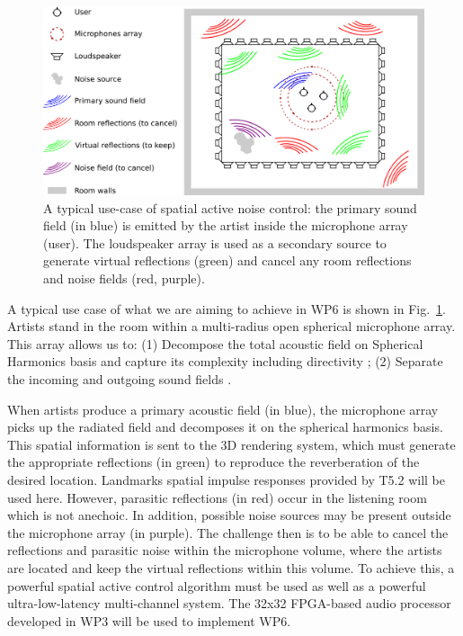 \documentclass[a4paper,9pt]{extarticle}
\begin{document}
\begin{figure}[!htpb]
    \centering
    \includegraphics[width=13cm]{img/spatial_anc.png}
    \caption{A typical use-case of spatial active noise control: the primary sound field (in blue) is emitted by the artist inside the microphone array (user). The loudspeaker array is used as a secondary source to generate virtual reflections (green) and cancel any room reflections and noise fields (red, purple).}
    \label{fig:spatial_anc}
\end{figure}

A typical use case of what we are aiming to achieve in WP6 is shown in Fig.~\ref{fig:spatial_anc}. Artists stand in the room within a multi-radius open spherical microphone array. This array allows us to: (1) Decompose the total acoustic field on Spherical Harmonics basis  \cite{jin2014design} and capture its complexity including directivity \cite{pollow2009measuring}; (2) Separate the incoming and outgoing sound fields \cite{braikia2013evaluation}.

When artists produce a primary acoustic field (in blue), the microphone array picks up the radiated field and decomposes it on the spherical harmonics basis. This spatial information is sent to the 3D rendering system, which must generate the appropriate reflections (in green) to reproduce the reverberation of the desired location. Landmarks spatial impulse responses provided by T5.2 will be used here. However, parasitic reflections (in red) occur in the listening room which is not anechoic. In addition, possible noise sources may be present outside the microphone array (in purple). The challenge then is to be able to cancel the reflections and parasitic noise within the microphone volume, where the artists are located and keep the virtual reflections within this volume. To achieve this, a powerful spatial active control algorithm must be used as well as a powerful ultra-low-latency multi-channel system. The 32x32 FPGA-based audio processor developed in WP3 will be used to implement WP6. 
\end{document}
